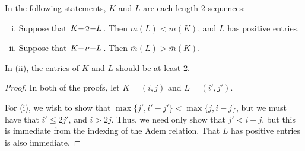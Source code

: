 \documentclass[11pt]{article}
\makeatletter
\newcommand{\produces}[3]{{#1}{#3}{#2}}
\renewcommand{\Q}{Q}
\newcommand{\SqShift}{\Sq_{+}}
\newcommand{\Sq}{\mathrm{Sq}}
\newcommand{\minDim}{m}
\newcommand{\minDimP}{\overline{m}}
\renewcommand{\produces}[3]{
{
\def\labelstyle{\scriptstyle}
\xymatrix@C=2em@1{
{#1}
\ar@{-}[r]|-{{\,#3\,}}
&%
{#2}%
}}}
\makeatother
\begin{document}
\begin{SteenrodAlgebrasAndTheirKoszulDuals}
\begin{lem*}
In the following statements, $K$ and $L$ are each length 2 sequences:%
%
\begin{enumerate}[i)]
\setlength{\parindent}{.25in}
\item Suppose that $\produces{K}{L}{\Q}$. Then $\minDim(L)<\minDim(K)$, and $L$ has positive entries.
\item Suppose that $\produces{K}{L}{P}$. Then $\minDimP(L) > \minDimP(K)$.
\end{enumerate}
In (ii), the entries of $K$ and $L$ should be at least 2.
\end{lem*}
\begin{proof}
In both of the proofs, let $K=(i,j)$ and $L=(i',j')$.

For (i), we wish to show that $\max\{j',i'-j'\}<\max\{j,i-j\}$, but we must have that $i'\leq 2j'$, and $i>2j$. Thus, we need only show that $j'<i-j$, but this is immediate from the indexing of the Adem relation. That $L$ has positive entries is also immediate.


\end{proof}
\end{SteenrodAlgebrasAndTheirKoszulDuals}
\end{document}
